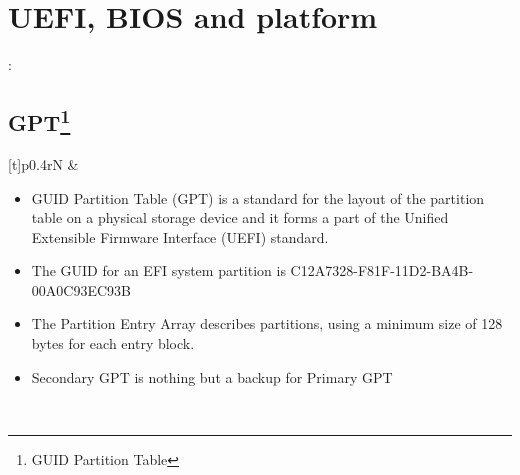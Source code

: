 \chapter{UEFI, BIOS and platform}
\begin{note}[Abbreviations]:\\
	
\end{note}
\section[GPT]{GPT\protect\footnote{GUID Partition Table}}
\begin{tabularx}{\textwidth}[t]{p{}rN}
 &  \\ 
 \begin{itemize}
 	\item GUID Partition Table (GPT) is a standard for the layout of the partition table on a physical storage device and it forms a part of the Unified Extensible Firmware Interface (UEFI) standard.
 	\item The GUID for an EFI system partition is C12A7328-F81F-11D2-BA4B-00A0C93EC93B
 	\item The Partition Entry Array describes partitions, using a minimum size of 128 bytes for each entry block.
 	\item Secondary GPT is nothing but a backup for Primary GPT
 \end{itemize} \\ [11cm]
\end{tabularx}

